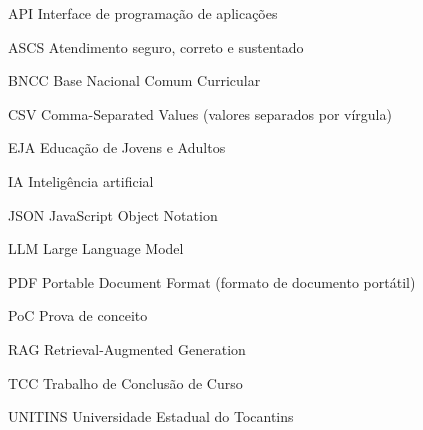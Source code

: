 \documentclass[12pt,openany,oneside,a4paper,chapter=TITLE,english,brazil]{abntex2}
\renewcommand{\contentsname}{SUMÁRIO}%
\begin{document}
\listoftables*
\cleardoublepage
\begin{siglas}
\item[API] Interface de programação de aplicações
\item[ASCS] Atendimento seguro, correto e sustentado
\item[BNCC] Base Nacional Comum Curricular
\item[CSV] Comma-Separated Values (valores separados por vírgula)
\item[EJA] Educação de Jovens e Adultos
\item[IA] Inteligência artificial
\item[JSON] JavaScript Object Notation
\item[LLM] Large Language Model
\item[PDF] Portable Document Format (formato de documento portátil)
\item[PoC] Prova de conceito
\item[RAG] Retrieval-Augmented Generation
\item[TCC] Trabalho de Conclusão de Curso
\item[UNITINS] Universidade Estadual do Tocantins
\end{siglas}
\pdfbookmark[0]{\contentsname}{toc}
{\setlength{\cftbeforechapterskip}{0.6em}\tableofcontents*}
\cleardoublepage
\textual
\pagestyle{simple}





\postextual

\end{document}
